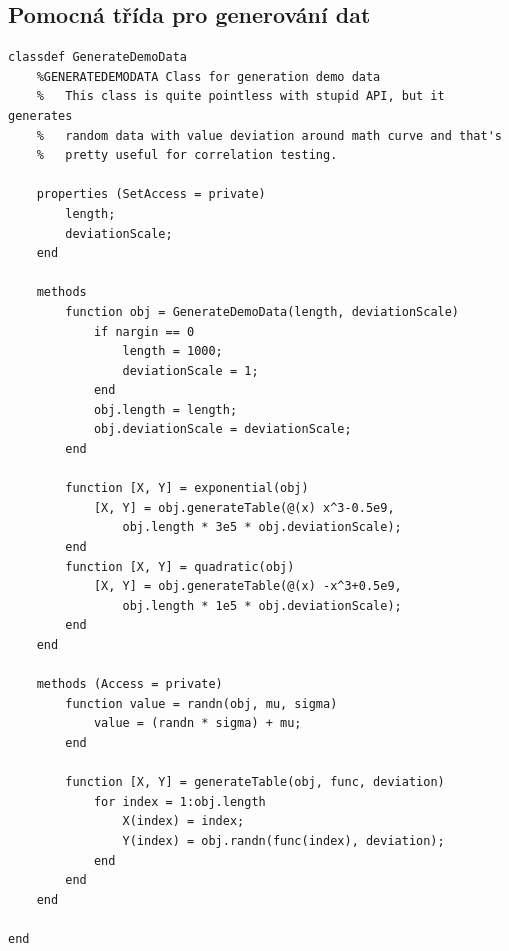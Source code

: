 \subsection*{Pomocná třída pro generování dat}
\begin{verbatim}
classdef GenerateDemoData
    %GENERATEDEMODATA Class for generation demo data
    %   This class is quite pointless with stupid API, but it generates
    %   random data with value deviation around math curve and that's
    %   pretty useful for correlation testing.

    properties (SetAccess = private)
        length;
        deviationScale;
    end

    methods
        function obj = GenerateDemoData(length, deviationScale)
            if nargin == 0
                length = 1000;
                deviationScale = 1;
            end
            obj.length = length;
            obj.deviationScale = deviationScale;
        end

        function [X, Y] = exponential(obj)
            [X, Y] = obj.generateTable(@(x) x^3-0.5e9,
                obj.length * 3e5 * obj.deviationScale);
        end
        function [X, Y] = quadratic(obj)
            [X, Y] = obj.generateTable(@(x) -x^3+0.5e9,
                obj.length * 1e5 * obj.deviationScale);
        end
    end

    methods (Access = private)
        function value = randn(obj, mu, sigma)
            value = (randn * sigma) + mu;
        end

        function [X, Y] = generateTable(obj, func, deviation)
            for index = 1:obj.length
                X(index) = index;
                Y(index) = obj.randn(func(index), deviation);
            end
        end
    end

end
\end{verbatim}

\newpage
